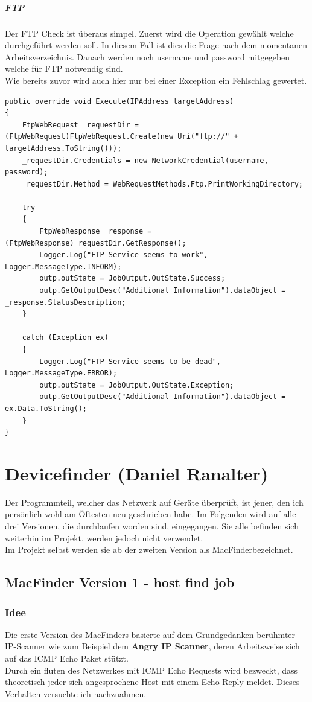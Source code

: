 \documentclass[12pt,a4paper]{report}
\begin{document}
\begin{onehalfspace}
\paragraph{FTP}
Der FTP Check ist überaus simpel. Zuerst wird die Operation gewählt welche durchgeführt werden soll. In diesem Fall ist dies die Frage nach dem momentanen Arbeitsverzeichnis. Danach werden noch username und password mitgegeben welche für FTP notwendig sind.\\
Wie bereits zuvor wird auch hier nur bei einer Exception ein Fehlschlag gewertet. 
\begin{lstlisting}
public override void Execute(IPAddress targetAddress)
{
	FtpWebRequest _requestDir = (FtpWebRequest)FtpWebRequest.Create(new Uri("ftp://" + targetAddress.ToString()));		
    _requestDir.Credentials = new NetworkCredential(username, password);
    _requestDir.Method = WebRequestMethods.Ftp.PrintWorkingDirectory;

    try
    {
    	FtpWebResponse _response = (FtpWebResponse)_requestDir.GetResponse();
        Logger.Log("FTP Service seems to work", Logger.MessageType.INFORM);
        outp.outState = JobOutput.OutState.Success;
        outp.GetOutputDesc("Additional Information").dataObject = _response.StatusDescription;
    }

    catch (Exception ex)
    {
    	Logger.Log("FTP Service seems to be dead", Logger.MessageType.ERROR);
        outp.outState = JobOutput.OutState.Exception;
        outp.GetOutputDesc("Additional Information").dataObject = ex.Data.ToString();
   	}
}
\end{lstlisting}

\chapter{Devicefinder (Daniel Ranalter)}
Der Programmteil, welcher das Netzwerk auf Geräte überprüft, ist jener, den ich persönlich wohl am Öftesten neu geschrieben habe. Im Folgenden wird auf alle drei Versionen, die durchlaufen worden sind, eingegangen. Sie alle befinden sich weiterhin im Projekt, werden jedoch nicht verwendet.\\
Im Projekt selbst werden sie ab der zweiten Version als \glqq MacFinder\grqq bezeichnet. 
\section{MacFinder Version 1 - host find job}
\subsection{Idee}
Die erste Version des MacFinders basierte auf dem Grundgedanken berühmter IP-Scanner wie zum Beispiel dem \textbf{Angry IP Scanner}, deren Arbeitsweise sich auf das ICMP Echo Paket stützt.\\
Durch ein fluten des Netzwerkes mit ICMP Echo Requests wird bezweckt, dass theoretisch jeder sich angesprochene Host mit einem Echo Reply meldet. Dieses Verhalten versuchte ich nachzuahmen.\\


\end{onehalfspace}
\end{document}
